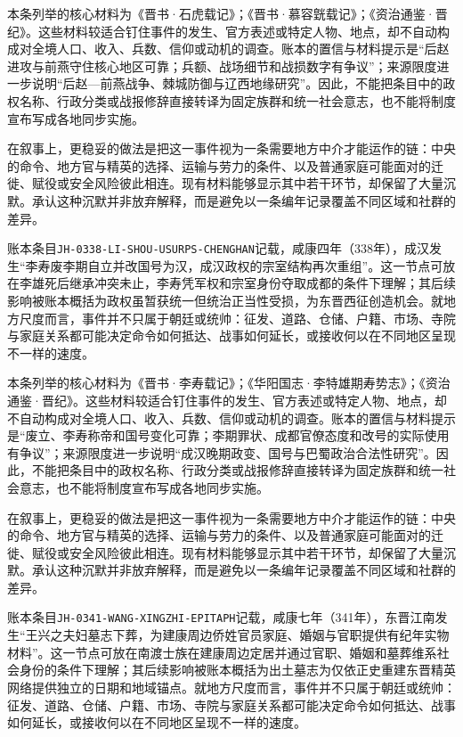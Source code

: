 本条列举的核心材料为《晋书·石虎载记》；《晋书·慕容皝载记》；《资治通鉴·晋纪》。这些材料较适合钉住事件的发生、官方表述或特定人物、地点，却不自动构成对全境人口、收入、兵数、信仰或动机的调查。账本的置信与材料提示是“后赵进攻与前燕守住核心地区可靠；兵额、战场细节和战损数字有争议”；来源限度进一步说明“后赵—前燕战争、棘城防御与辽西地缘研究”。因此，不能把条目中的政权名称、行政分类或战报修辞直接转译为固定族群和统一社会意志，也不能将制度宣布写成各地同步实施。

在叙事上，更稳妥的做法是把这一事件视为一条需要地方中介才能运作的链：中央的命令、地方官与精英的选择、运输与劳力的条件、以及普通家庭可能面对的迁徙、赋役或安全风险彼此相连。现有材料能够显示其中若干环节，却保留了大量沉默。承认这种沉默并非放弃解释，而是避免以一条编年记录覆盖不同区域和社群的差异。

账本条目\texttt{JH-0338-LI-SHOU-USURPS-CHENGHAN}记载，咸康四年（338年），成汉发生“李寿废李期自立并改国号为汉，成汉政权的宗室结构再次重组”。这一节点可放在李雄死后继承冲突未止，李寿凭军权和宗室身份夺取成都的条件下理解；其后续影响被账本概括为政权虽暂获统一但统治正当性受损，为东晋西征创造机会。就地方尺度而言，事件并不只属于朝廷或统帅：征发、道路、仓储、户籍、市场、寺院与家庭关系都可能决定命令如何抵达、战事如何延长，或接收何以在不同地区呈现不一样的速度。

本条列举的核心材料为《晋书·李寿载记》；《华阳国志·李特雄期寿势志》；《资治通鉴·晋纪》。这些材料较适合钉住事件的发生、官方表述或特定人物、地点，却不自动构成对全境人口、收入、兵数、信仰或动机的调查。账本的置信与材料提示是“废立、李寿称帝和国号变化可靠；李期罪状、成都官僚态度和改号的实际使用有争议”；来源限度进一步说明“成汉晚期政变、国号与巴蜀政治合法性研究”。因此，不能把条目中的政权名称、行政分类或战报修辞直接转译为固定族群和统一社会意志，也不能将制度宣布写成各地同步实施。

在叙事上，更稳妥的做法是把这一事件视为一条需要地方中介才能运作的链：中央的命令、地方官与精英的选择、运输与劳力的条件、以及普通家庭可能面对的迁徙、赋役或安全风险彼此相连。现有材料能够显示其中若干环节，却保留了大量沉默。承认这种沉默并非放弃解释，而是避免以一条编年记录覆盖不同区域和社群的差异。

账本条目\texttt{JH-0341-WANG-XINGZHI-EPITAPH}记载，咸康七年（341年），东晋江南发生“王兴之夫妇墓志下葬，为建康周边侨姓官员家庭、婚姻与官职提供有纪年实物材料”。这一节点可放在南渡士族在建康周边定居并通过官职、婚姻和墓葬维系社会身份的条件下理解；其后续影响被账本概括为出土墓志为仅依正史重建东晋精英网络提供独立的日期和地域锚点。就地方尺度而言，事件并不只属于朝廷或统帅：征发、道路、仓储、户籍、市场、寺院与家庭关系都可能决定命令如何抵达、战事如何延长，或接收何以在不同地区呈现不一样的速度。

